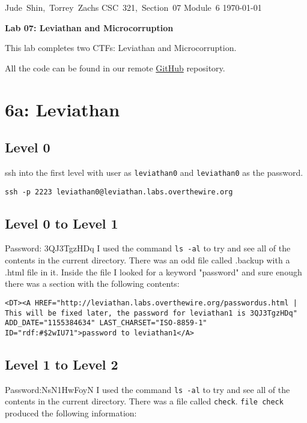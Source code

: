 \documentclass[11pt]{article}
\begin{document}
\hfill\vbox{\hbox{Jude Shin, Torrey Zachs}
		\hbox{CSC 321, Section 07}	
		\hbox{Module 6}	
		\hbox{\today}}\par

\bigskip
\centerline{\Large\bf Lab 07: Leviathan and Microcorruption}\par
\bigskip

This lab completes two CTFs: Leviathan and Microcorruption.

All the code can be found in our remote \href{https://github.com/jude-shin/CSC\_321}{GitHub} repository.


\section*{6a: Leviathan}
\subsection*{Level 0}
ssh into the first level with user as \verb|leviathan0| and \verb|leviathan0| as the password.

\begin{lstlisting}
ssh -p 2223 leviathan0@leviathan.labs.overthewire.org
\end{lstlisting}

\subsection*{Level 0 to Level 1}
Password: 3QJ3TgzHDq
I used the command \verb|ls -al| to try and see all of the contents in the current directory. There was an odd file called .backup with a .html file in it. Inside the file I looked for a keyword "password" and sure enough there was a section with the following contents:

\begin{lstlisting}
<DT><A HREF="http://leviathan.labs.overthewire.org/passwordus.html | This will be fixed later, the password for leviathan1 is 3QJ3TgzHDq" ADD_DATE="1155384634" LAST_CHARSET="ISO-8859-1" ID="rdf:#$2wIU71">password to leviathan1</A>
\end{lstlisting}

\subsection*{Level 1 to Level 2}
Password:NsN1HwFoyN
I used the command \verb|ls -al| to try and see all of the contents in the current directory. There was a file called \verb|check|. \verb|file check| produced the following information:
\end{document}
